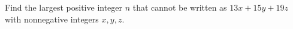 Find the largest positive integer $n$ that cannot be written as $13x+15y+19z$ with nonnegative integers $x,y,z$.
